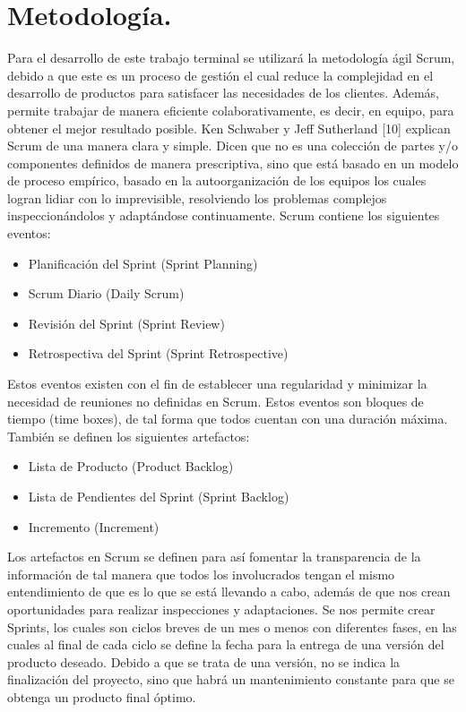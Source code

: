 \documentclass[12pt, a4paper, titlepage]{report}
\begin{document}
	    \section{Metodolog\'ia.}
	    Para el desarrollo de este trabajo terminal se utilizará la metodología ágil Scrum, debido a que este es un
	    proceso de gestión el cual reduce la complejidad en el desarrollo de productos para satisfacer las necesidades de los clientes. Además, permite trabajar de manera eficiente colaborativamente, es decir, en equipo, para obtener el mejor resultado posible. Ken Schwaber y Jeff Sutherland [10] explican Scrum de una manera clara y simple. Dicen que no es una colección de partes y/o componentes definidos de manera prescriptiva, sino que está basado en un modelo de proceso empírico, basado en la autoorganización de los equipos los cuales logran lidiar con lo imprevisible, resolviendo los problemas complejos inspeccionándolos y adaptándose continuamente. Scrum contiene los siguientes eventos:
	    \begin{itemize}
	    	\item Planificación del Sprint (Sprint Planning)
	    	\item Scrum Diario (Daily Scrum)
	    	\item Revisión del Sprint (Sprint Review)
	    	\item Retrospectiva del Sprint (Sprint Retrospective)
	    \end{itemize}
    	Estos eventos existen con el fin de establecer una regularidad y minimizar la necesidad de reuniones no definidas en Scrum. Estos eventos son bloques de tiempo (time boxes), de tal forma que todos cuentan con una duración máxima. También se definen los siguientes artefactos:
		\begin{itemize}
			\item Lista de Producto (Product Backlog)
			\item Lista de Pendientes del Sprint (Sprint Backlog)
			\item Incremento (Increment)
		\end{itemize}
		Los artefactos en Scrum se definen para así fomentar la transparencia de la información de tal manera que todos
		los involucrados tengan el mismo entendimiento de que es lo que se está llevando a cabo, además de que nos
		crean oportunidades para realizar inspecciones y adaptaciones.
		Se nos permite crear Sprints, los cuales son ciclos breves de un mes o menos con diferentes fases, en las cuales
		al final de cada ciclo se define la fecha para la entrega de una versión del producto deseado. Debido a que se
		trata de una versión, no se indica la finalización del proyecto, sino que habrá un mantenimiento constante para
		que se obtenga un producto final óptimo.
    		
\end{document}
